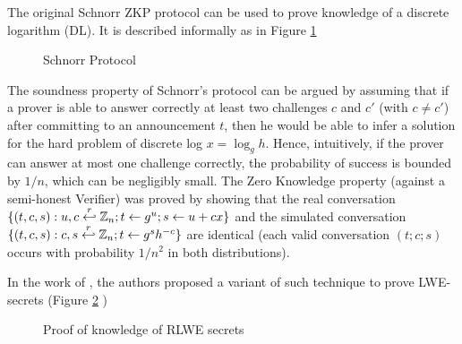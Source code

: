 The original Schnorr ZKP protocol \cite{schnorr1989efficient} can be used to prove
knowledge of a discrete logarithm (DL). It is described informally as in
Figure \ref{fig:schnorrProtocol}

\begin{figure}[htbp!] 
\centering {}
\caption{Schnorr Protocol}
\label{fig:schnorrProtocol}
\end{figure}

The soundness property of Schnorr's protocol can be argued by assuming that if a prover
is able to answer correctly at least two challenges $c$ and $c'$ (with
$c \neq c'$) after committing to an announcement $t$, then he would be able to infer
a solution for the hard problem of discrete log $x = \log_{g}h$. Hence,
intuitively, if the prover can answer at most one challenge correctly, the
probability of success is bounded by $1/n$, which can be negligibly small. The
Zero Knowledge property (against a semi-honest Verifier) was proved by showing
that the real conversation
$\{(t,c,s): u,c \stackrel{r}{\hookleftarrow} \mathbb{Z}_{n}; t \gets g^{u}; s \gets u + cx\}$
and the simulated conversation
$\{(t,c,s): c, s \stackrel{r}{\hookleftarrow} \mathbb{Z}_{n}; t \gets g^{s}h^{-c}\}$ are
identical (each valid conversation $(t;c;s)$ occurs with probability $1/n^{2}$
in both distributions).

In the work of \cite{benhamouda2014better}, the authors proposed a variant of
such technique to prove LWE-secrets (Figure \ref{fig:benhamoudaProtocol} )
\begin{figure}[htbp!] 
\centering {}
\caption{Proof of knowledge of RLWE secrets}
\label{fig:benhamoudaProtocol}
\end{figure}

